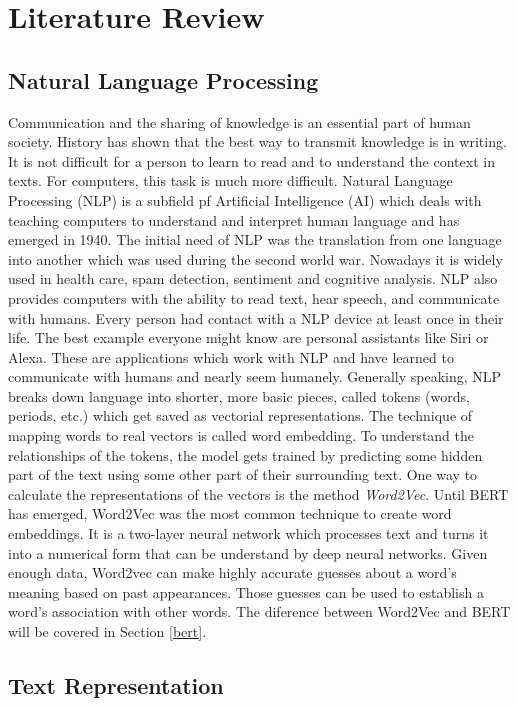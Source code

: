 \chapter{Literature Review} \label{chapter:literaturereview}

\section{Natural Language Processing}
\alert{Communication and the sharing of knowledge is an essential part of human society. History has shown that the best way to transmit knowledge is in writing. It is not difficult for a person to learn to read and to understand the context in texts. For computers, this task is much more difficult. Natural Language Processing (NLP) is a subfield pf Artificial Intelligence (AI) which deals with teaching computers to understand and interpret human language and has emerged in 1940. The initial need of NLP was the translation from one language into another which was used during the second world war. Nowadays it is widely used in health care, spam detection, sentiment and cognitive analysis. NLP also provides computers with the ability to read text, hear speech, and communicate with humans. Every person had contact with a NLP device at least once in their life. The best example everyone might know are personal assistants like Siri or Alexa. These are applications which work with NLP and have learned to communicate with humans and nearly seem humanely.\newline
Generally speaking, NLP breaks down language into shorter, more basic pieces, called tokens (words, periods, etc.) which get saved as vectorial representations. The technique of mapping words to real vectors is called word embedding. To understand the relationships of the tokens, the model gets trained by predicting some hidden part of the text using some other part of their surrounding text. One way to calculate the representations of the vectors is the method \textit{Word2Vec}. Until BERT has emerged, Word2Vec was the most common technique to create word embeddings. It is a two-layer neural network which processes text and turns it into a numerical form that can be understand by deep neural networks. Given enough data, Word2vec can make highly accurate guesses about a word’s meaning based on past appearances. Those guesses can be used to establish a word’s association with other words. The diference between Word2Vec and BERT will be covered in Section \ref{bert}}.

\section{Text Representation}

